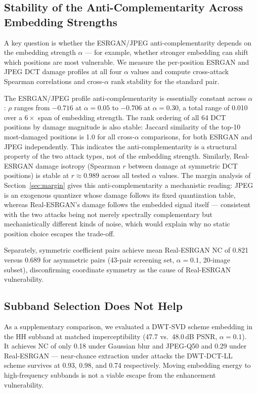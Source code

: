 \documentclass[conference]{IEEEtran}
\begin{document}
\subsection{Stability of the Anti-Complementarity Across Embedding Strengths}

A key question is whether the ESRGAN/JPEG anti-complementarity depends
on the embedding strength $\alpha$ --- for example, whether stronger
embedding can shift which positions are most vulnerable. We measure the
per-position ESRGAN and JPEG DCT damage profiles at all four $\alpha$
values and compute cross-attack Spearman correlations and cross-$\alpha$
rank stability for the standard pair.

The ESRGAN/JPEG profile anti-complementarity is essentially constant
across $\alpha$: $\rho$ ranges from $-0.716$ at $\alpha=0.05$ to
$-0.706$ at $\alpha=0.30$, a total range of 0.010 over a $6\times$ span
of embedding strength. The rank ordering of all 64 DCT positions by
damage magnitude is also stable: Jaccard similarity of the top-10
most-damaged positions is 1.0 for all cross-$\alpha$ comparisons, for
both ESRGAN and JPEG independently. This indicates the anti-complementarity
is a structural property of the two attack types, not of the embedding
strength. Similarly, Real-ESRGAN damage isotropy (Spearman $r$ between
damage at symmetric DCT positions) is stable at $r \approx 0.989$
across all tested $\alpha$ values. The margin analysis of
Section~\ref{sec:margin} gives this anti-complementarity a mechanistic
reading: JPEG is an exogenous quantizer whose damage follows its fixed
quantization table, whereas Real-ESRGAN's damage follows the embedded
signal itself --- consistent with the two attacks being not merely
spectrally complementary but mechanistically different kinds of noise,
which would explain why no static position choice escapes the
trade-off.

Separately, symmetric coefficient pairs achieve mean Real-ESRGAN NC of
0.821 versus 0.689 for asymmetric pairs (43-pair screening set,
$\alpha=0.1$, 20-image subset), disconfirming coordinate symmetry as
the cause of Real-ESRGAN vulnerability.

\subsection{Subband Selection Does Not Help}
As a supplementary comparison, we evaluated a DWT-SVD scheme embedding
in the HH subband at matched imperceptibility (47.7 vs.\ 48.0\,dB
PSNR, $\alpha=0.1$). It achieves NC of only 0.18 under Gaussian blur
and JPEG-Q50 and
0.29 under Real-ESRGAN --- near-chance extraction under attacks
the DWT-DCT-LL scheme survives at 0.93, 0.98, and 0.74 respectively.
Moving embedding energy to high-frequency subbands is not a viable
escape from the enhancement vulnerability.
\end{document}
